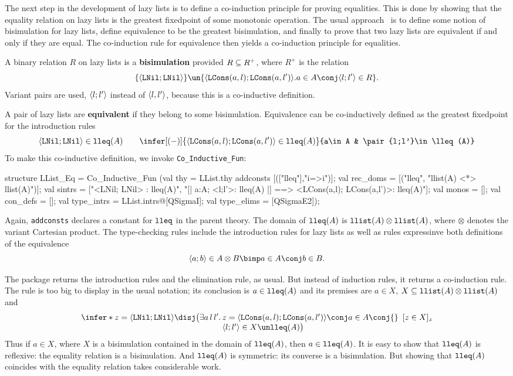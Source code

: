 The next step in the development of lazy lists is to define a co-induction
principle for proving equalities.  This is done by showing that the equality
relation on lazy lists is the greatest fixedpoint of some monotonic
operation.  The usual approach~\cite{pitts94} is to define some notion of 
bisimulation for lazy lists, define equivalence to be the greatest
bisimulation, and finally to prove that two lazy lists are equivalent if and
only if they are equal.  The co-induction rule for equivalence then yields a
co-induction principle for equalities.

A binary relation $R$ on lazy lists is a {\bf bisimulation} provided $R\subseteq
R^+$, where $R^+$ is the relation
\[ \{\pair{\LNil;\LNil}\} \un 
   \{\pair{\LCons(a,l);\LCons(a,l')} . a\in A \conj \pair{l;l'}\in R\}.
\]
Variant pairs are used, $\langle l;l'\rangle$ instead of $\langle l,l'\rangle$, because this
is a co-inductive definition. 

A pair of lazy lists are {\bf equivalent} if they belong to some bisimulation. 
Equivalence can be co-inductively defined as the greatest fixedpoint for the
introduction rules
\[  \pair{\LNil;\LNil} \in\lleq(A)  \qquad 
    \infer[(-)]{\pair{\LCons(a,l);\LCons(a,l')} \in\lleq(A)}
          {a\in A & \pair{l;l'}\in \lleq(A)}
\]
To make this co-inductive definition, we invoke \verb|Co_Inductive_Fun|:
\begin{ttbox}
structure LList_Eq = Co_Inductive_Fun
(val thy = LList.thy addconsts [(["lleq"],"i=>i")];
 val rec_doms = [("lleq", "llist(A) <*> llist(A)")];
 val sintrs = 
   ["<LNil; LNil> : lleq(A)",
    "[| a:A; <l;l'>: lleq(A) |] ==> <LCons(a,l); LCons(a,l')>: lleq(A)"];
 val monos = [];
 val con_defs = [];
 val type_intrs = LList.intrs@[QSigmaI];
 val type_elims = [QSigmaE2]);
\end{ttbox}
Again, {\tt addconsts} declares a constant for ${\tt lleq}$ in the parent theory. 
The domain of ${\tt lleq}(A)$ is ${\tt llist}(A)\otimes{\tt llist}(A)$, where $\otimes$
denotes the variant Cartesian product.  The type-checking rules include the
introduction rules for lazy lists as well as rules expressinve both
definitions of the equivalence
\[ \pair{a;b}\in A\otimes B \bimp a\in A \conj b\in B. \]

The package returns the introduction rules and the elimination rule, as
usual.  But instead of induction rules, it returns a co-induction rule.
The rule is too big to display in the usual notation; its conclusion is
$a\in{\tt lleq}(A)$ and its premises are $a\in X$, $X\subseteq {\tt llist}(A)\otimes{\tt llist}(A)$
and
\[ \infer*{z=\pair{\LNil;\LNil}\disj \bigl(\exists a\,l\,l'.\,
      \begin{array}[t]{@{}l}
        z=\pair{\LCons(a,l);\LCons(a,l')} \conj a\in A \conj{}\\
        \pair{l;l'}\in X\un\lleq(A) \bigr)
      \end{array}  }{[z\in X]_z}
\]
Thus if $a\in X$, where $X$ is a bisimulation contained in the
domain of ${\tt lleq}(A)$, then $a\in{\tt lleq}(A)$.  It is easy to show that
${\tt lleq}(A)$ is reflexive: the equality relation is a bisimulation.  And
${\tt lleq}(A)$ is symmetric: its converse is a bisimulation.  But showing that
${\tt lleq}(A)$ coincides with the equality relation takes considerable work.

